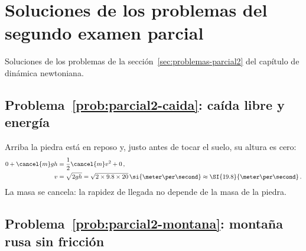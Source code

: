 %
%
%

\section{Soluciones de los problemas del segundo examen parcial}
\label{sec:soluciones-parcial2}

Soluciones de los problemas de la
sección~\ref{sec:problemas-parcial2} del capítulo de dinámica newtoniana.

\subsection*{Problema~\ref{prob:parcial2-caida}: caída libre y energía}
\label{sol:parcial2-caida}

Arriba la piedra está en reposo y, justo antes de tocar el suelo, su altura
es cero:
\begin{align}
    0 + \cancel{m}gh &= \frac{1}{2}\cancel{m}v^2 + 0\,, \nonumber\\
    v &= \sqrt{2gh} = \sqrt{2 \times 9.8 \times 20}\,\si{\meter\per\second}
      \approx \SI{19.8}{\meter\per\second}\,.
\end{align}
La masa se cancela: la rapidez de llegada no depende de la masa de la
piedra.

\subsection*{Problema~\ref{prob:parcial2-montana}: montaña rusa sin fricción}
\label{sol:parcial2-montana}

